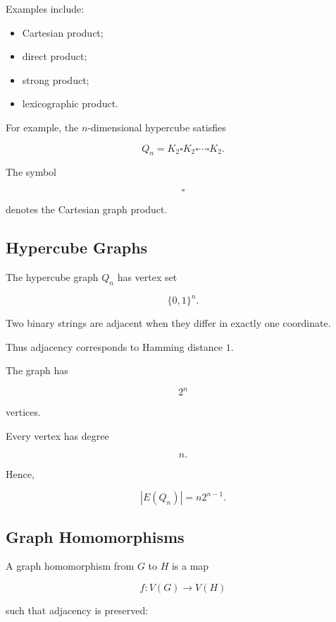 Examples include:

\begin{itemize}
    \item Cartesian product;
    \item direct product;
    \item strong product;
    \item lexicographic product.
\end{itemize}

For example, the \(n\)-dimensional hypercube satisfies

\[
\boxed{
Q_n
=
K_2\square K_2\square\cdots\square K_2.
}
\]

The symbol

\[
\square
\]

denotes the Cartesian graph product.

\subsection{Hypercube Graphs}
\label{subsec:hypercube-graphs}

The hypercube graph \(Q_n\) has vertex set

\[
\{0,1\}^n.
\]

Two binary strings are adjacent when they differ in exactly one
coordinate.

Thus adjacency corresponds to Hamming distance \(1\).

The graph has

\[
\boxed{
2^n
}
\]

vertices.

Every vertex has degree

\[
n.
\]

Hence,

\[
\boxed{
|E(Q_n)|
=
n2^{n-1}.
}
\]

\subsection{Graph Homomorphisms}
\label{subsec:graph-homomorphisms}

A graph homomorphism from \(G\) to \(H\) is a map

\[
f:V(G)\to V(H)
\]

such that adjacency is preserved:

